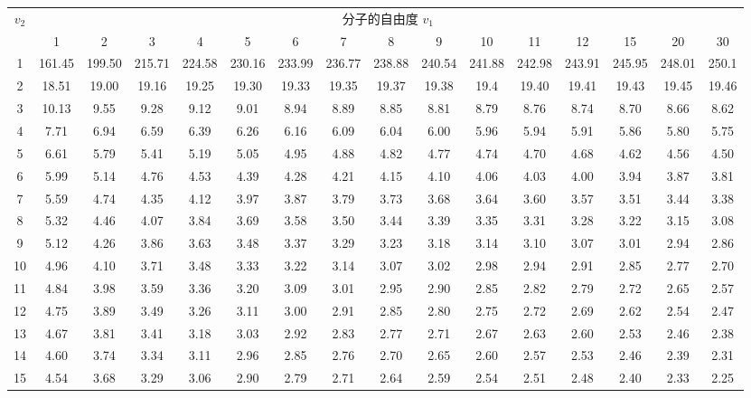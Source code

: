 \documentclass[lang=cn,10pt]{elegantbook}
\begin{document}
\footnotesize
\begin{longtable}{c|ccccccccccccccc}
    \hline
    $v_2$ & \multicolumn{15}{c}{分子的自由度 $v_1$} \\
    & 1 & 2 & 3 & 4 & 5 & 6 & 7 & 8 & 9 & 10 & 11 & 12 & 15 & 20 & 30 \\
    \hline
    \endhead
    1 & 161.45 & 199.50 & 215.71 & 224.58 & 230.16 & 233.99 & 236.77 & 238.88 & 240.54 & 241.88 & 242.98 & 243.91 & 245.95 & 248.01 & 250.1 \\
    2 & 18.51 & 19.00 & 19.16 & 19.25 & 19.30 & 19.33 & 19.35 & 19.37 & 19.38 & 19.4 & 19.40 & 19.41 & 19.43 & 19.45 & 19.46 \\
    3 & 10.13 & 9.55 & 9.28 & 9.12 & 9.01 & 8.94 & 8.89 & 8.85 & 8.81 & 8.79 & 8.76 & 8.74 & 8.70 & 8.66 & 8.62 \\
    4 & 7.71 & 6.94 & 6.59 & 6.39 & 6.26 & 6.16 & 6.09 & 6.04 & 6.00 & 5.96 & 5.94 & 5.91 & 5.86 & 5.80 & 5.75 \\
    5 & 6.61 & 5.79 & 5.41 & 5.19 & 5.05 & 4.95 & 4.88 & 4.82 & 4.77 & 4.74 & 4.70 & 4.68 & 4.62 & 4.56 & 4.50 \\
    6 & 5.99 & 5.14 & 4.76 & 4.53 & 4.39 & 4.28 & 4.21 & 4.15 & 4.10 & 4.06 & 4.03 & 4.00 & 3.94 & 3.87 & 3.81 \\
    7 & 5.59 & 4.74 & 4.35 & 4.12 & 3.97 & 3.87 & 3.79 & 3.73 & 3.68 & 3.64 & 3.60 & 3.57 & 3.51 & 3.44 & 3.38 \\
    8 & 5.32 & 4.46 & 4.07 & 3.84 & 3.69 & 3.58 & 3.50 & 3.44 & 3.39 & 3.35 & 3.31 & 3.28 & 3.22 & 3.15 & 3.08 \\
    9 & 5.12 & 4.26 & 3.86 & 3.63 & 3.48 & 3.37 & 3.29 & 3.23 & 3.18 & 3.14 & 3.10 & 3.07 & 3.01 & 2.94 & 2.86 \\
    10 & 4.96 & 4.10 & 3.71 & 3.48 & 3.33 & 3.22 & 3.14 & 3.07 & 3.02 & 2.98 & 2.94 & 2.91 & 2.85 & 2.77 & 2.70 \\
    11 & 4.84 & 3.98 & 3.59 & 3.36 & 3.20 & 3.09 & 3.01 & 2.95 & 2.90 & 2.85 & 2.82 & 2.79 & 2.72 & 2.65 & 2.57 \\
    12 & 4.75 & 3.89 & 3.49 & 3.26 & 3.11 & 3.00 & 2.91 & 2.85 & 2.80 & 2.75 & 2.72 & 2.69 & 2.62 & 2.54 & 2.47 \\
    13 & 4.67 & 3.81 & 3.41 & 3.18 & 3.03 & 2.92 & 2.83 & 2.77 & 2.71 & 2.67 & 2.63 & 2.60 & 2.53 & 2.46 & 2.38 \\
    14 & 4.60 & 3.74 & 3.34 & 3.11 & 2.96 & 2.85 & 2.76 & 2.70 & 2.65 & 2.60 & 2.57 & 2.53 & 2.46 & 2.39 & 2.31 \\
    15 & 4.54 & 3.68 & 3.29 & 3.06 & 2.90 & 2.79 & 2.71 & 2.64 & 2.59 & 2.54 & 2.51 & 2.48 & 2.40 & 2.33 & 2.25 \\

\end{longtable}
\end{document}
